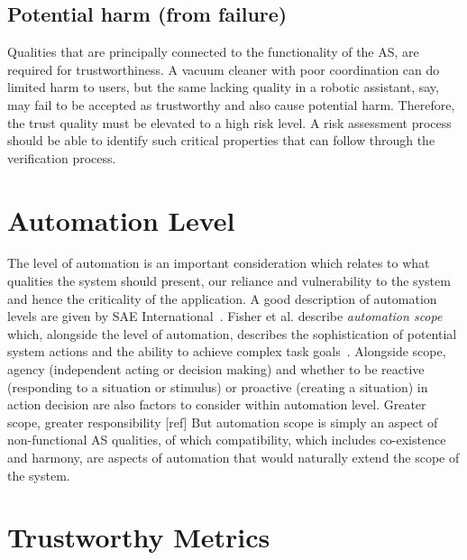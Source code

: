 \subsection{Potential harm (from failure)} \label{sec:app-harm}

Qualities that are principally connected to the functionality of the AS, are required for trustworthiness. A vacuum cleaner with poor coordination can do limited harm to users, but the same lacking quality in a robotic assistant, say, may fail to be accepted as trustworthy and also cause potential harm. Therefore, the trust quality must be elevated to a high risk level.
%
A risk assessment process should be able to identify such critical properties that can follow through the verification process. 


\section{Automation Level} \label{sec:autlev}

The level of automation is an important consideration which relates to what qualities the system should present, our reliance and vulnerability to the system and hence the criticality of the application. A good description of automation levels are given by SAE International~\cite{SAEJ3016}. 
%
Fisher et al. describe \emph{automation scope} which, alongside the level of automation, describes the sophistication of potential system actions and the ability to achieve complex task goals~\cite{Fisher2021}. 
%
Alongside scope, agency (independent acting or decision making) and whether to be reactive (responding to a situation or stimulus) or proactive (creating a situation) in action decision are also factors to consider within automation level.
%
Greater scope, greater responsibility [ref]
%
%
But automation scope is simply an aspect of non-functional AS qualities, of which compatibility, which includes co-existence and harmony, are aspects of automation that would naturally extend the scope of the system. 



\section{Trustworthy Metrics}

